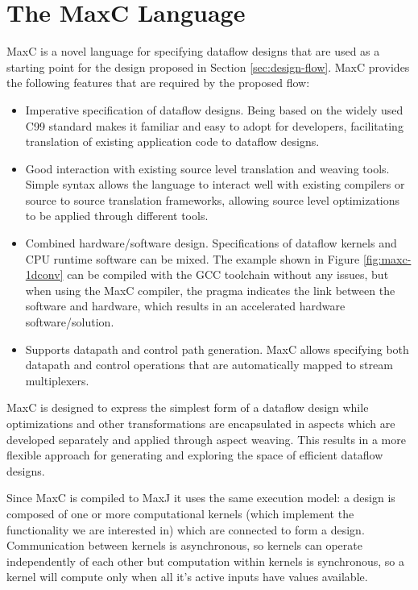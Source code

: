 \section{The  MaxC Language}
\label{sec:maxc}

MaxC is a novel language for specifying dataflow designs that are used
as a starting point for the design proposed in Section
\ref{sec:design-flow}. MaxC provides the following features that are
required by the proposed flow:

\begin{itemize}
\item Imperative specification of dataflow designs. Being based on the
  widely used C99 standard makes it familiar and easy to adopt for
  developers, facilitating translation of existing application code to
  dataflow designs.
\item Good interaction with existing source level translation and
  weaving tools. Simple syntax allows the language to interact well
  with existing compilers or source to source translation frameworks,
  allowing source level optimizations to be applied through different
  tools.
\item Combined hardware/software design. Specifications of dataflow
  kernels and CPU runtime software can be mixed. The example shown in
  Figure \ref{fig:maxc-1dconv} can be compiled with the GCC toolchain
  without any issues, but when using the MaxC compiler, the pragma
  indicates the link between the software and hardware, which results
  in an accelerated hardware software/solution.
\item Supports datapath and control path generation. MaxC allows
  specifying both datapath and control operations that are
  automatically mapped to stream multiplexers.
\end{itemize}

MaxC is designed to express the simplest form of a dataflow design
while optimizations and other transformations are encapsulated in
aspects which are developed separately and applied through aspect
weaving. This results in a more flexible approach for generating and
exploring the space of efficient dataflow designs.

Since MaxC is compiled to MaxJ it uses the same execution model: a
design is composed of one or more computational kernels (which
implement the functionality we are interested in) which are connected
to form a design. Communication between kernels is asynchronous, so
kernels can operate independently of each other but computation within
kernels is synchronous, so a kernel will compute only when all it's
active inputs have values available.

